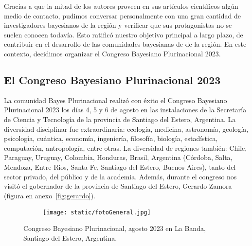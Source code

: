 \documentclass[a4paper,11pt]{book}
\theoremstyle{definition}
\begin{document}
Gracias a que la mitad de los autores proveen en sus art\'iculos cient\'ificos alg\'un medio de contacto, pudimos conversar personalmente con una gran cantidad de investigadores bayesianos de la regi\'on y verificar que sus protagonistas no se suelen conocen todav\'ia.
%
Esto ratific\'o nuestro objetivo principal a largo plazo, de contribuir en el desarrollo de las comunidades bayesianas de de la regi\'on.
%
En este contexto, decidimos organizar el Congreso Bayesiano Plurinacional 2023.
%

\subsection{El Congreso Bayesiano Plurinacional 2023}

La comunidad Bayes Plurinacional realiz\'o con \'exito el Congreso Bayesiano Plurinacional 2023 los d\'ias 4, 5 y 6 de agosto en las instalaciones de la Secretar\'ia de Ciencia y Tecnolog\'ia de la provincia de Santiago del Estero, Argentina.
%
La diversidad disciplinar fue extraordinaria: ecolog\'ia, medicina, astronom\'ia, geolog\'ia, psicolog\'ia, cu\'antica, econom\'ia, ingenier\'ia, filosof\'ia, biolog\'ia, estad\'istica, computaci\'on, antropolog\'ia, entre otras.
%
La diversidad de regiones tambi\'en: Chile, Paraguay, Uruguay, Colombia, Honduras, Brasil, Argentina (C\'ordoba, Salta, Mendoza, Entre Rios, Santa Fe, Santiago del Estero, Buenos Aires), tanto del sector privado, del p\'ublico y de la academia.
%
Adem\'as, durante el congreso nos visit\'o el gobernador de la provincia de Santiago del Estero, Gerardo Zamora (figura en anexo~\ref{fig:gerardo}).


\begin{figure}[!ht]
\centering
  \begin{subfigure}[b]{1\textwidth}
  \texttt{[image: static/fotoGeneral.jpg]}
  \end{subfigure}
  \caption{Congreso Bayesiano Plurinacional, agosto 2023 en La Banda, Santiago del Estero, Argentina.}
\end{figure}

\end{document}
